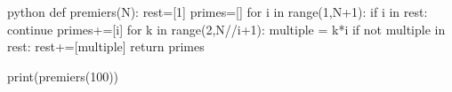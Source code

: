 \begin{mintedbox}{python}
def premiers(N):
	rest=[1]
	primes=[]
	for i in range(1,N+1):
	    if i in rest:
	        continue
	    primes+=[i]
	    for k in range(2,N//i+1):
	        multiple = k*i
	        if not multiple in rest:
	            rest+=[multiple]
	return primes
    
print(premiers(100))
\end{mintedbox}


